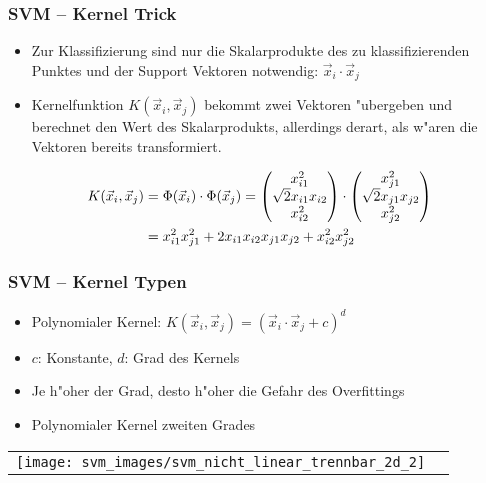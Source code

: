 \begin{frame}

\frametitle{SVM -- Kernel Trick}

\begin{itemize}
	\setlength{\itemsep}{7pt}
	\item Zur Klassifizierung sind nur die Skalarprodukte des zu klassifizierenden Punktes und der Support Vektoren notwendig: $\vec{x}_i \cdot \vec{x}_j$
	\item Kernelfunktion $K(\vec{x}_i,\vec{x}_j)$ bekommt zwei Vektoren "ubergeben und berechnet den Wert des Skalarprodukts, allerdings derart, als w"aren die Vektoren bereits transformiert.
\end{itemize}

\begin{equation}
	\begin{aligned}
	   K(\vec{x}_i,\vec{x}_j) 
	   & = \Phi(\vec{x}_i) \cdot \Phi(\vec{x}_j) 
	     = \begin{pmatrix}
		     x_{i1}^2 \\ \sqrt{2} x_{i1} x_{i2} \\ x_{i2}^2
	       \end{pmatrix} \cdot
	       \begin{pmatrix}
	  	     x_{j1}^2 \\ \sqrt{2} x_{j1} x_{j2} \\ x_{j2}^2
	       \end{pmatrix} \\
	   & = x_{i1}^2 x_{j1}^2 + 2 x_{i1} x_{i2} x_{j1} x_{j2} + x_{i2}^2 x_{j2}^2 \notag
	  \end{aligned}
\end{equation}

\end{frame}






\begin{frame}

\frametitle{SVM -- Kernel Typen}

\begin{itemize}
	\setlength{\itemsep}{7pt}
	\item Polynomialer Kernel: $K(\vec{x}_i,\vec{x}_j)= (\vec{x}_i \cdot \vec{x}_j +c)^d$
	\item $c$: Konstante, $d$: Grad des Kernels
	\item Je h"oher der Grad, desto h"oher die Gefahr des Overfittings
	\item Polynomialer Kernel zweiten Grades
\end{itemize}

\center
\begin{tabular}[h]{cl}
\texttt{[image: svm\_images/svm\_nicht\_linear\_trennbar\_2d\_2]} &  {\tiny \cite{svmsuccinctly}}
\end{tabular}

\end{frame}





